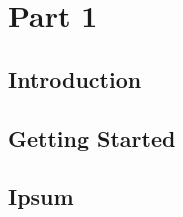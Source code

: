 \usepackage{lipsum}





\coverpage{\TITLE}{\SUBTITLE}{\AUTHOR}{\DATE}{\SUBJECT}
\newpage
\backgroundbarvisiblefalse
\pagestyle{plain}




\newpage
\tableofcontents

\part{Part 1}
\newpage
\chapter{Introduction} \label{ch:introduction}

\newpage
\chapter{Getting Started} \label{ch:getting_started}

\newpage
\chapter{Ipsum}\label{ch:ipsum}


